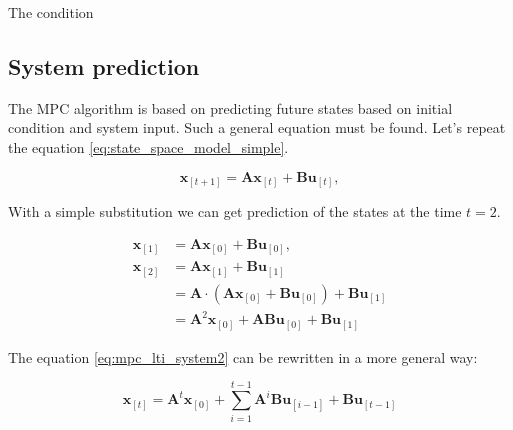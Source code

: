 \documentclass{article}
\begin{document}






The condition 

\subsubsection{}

\subsection{System prediction}
The MPC algorithm is based on predicting future states based on initial condition and system input. Such a general equation must be found. Let's repeat the equation \ref{eq:state_space_model_simple}.

\begin{equation}
\textbf{x}_{[t+1]} = \textbf{A}\textbf{x}_{[t]} + \textbf{B}\textbf{u}_{[t]},
\label{eq:mpc_lti_system}
\end{equation}

With a simple substitution we can get prediction of the states at the time $t = 2$.

\begin{equation}
\begin{split}
\label{eq:mpc_lti_system2}
\textbf{x}_{[1]} &= \textbf{A}\textbf{x}_{[0]} + \textbf{B}\textbf{u}_{[0]},\\
\textbf{x}_{[2]} &= \textbf{A}\textbf{x}_{[1]} + \textbf{B}\textbf{u}_{[1]}\\
&= \textbf{A}\cdot(\textbf{A}\textbf{x}_{[0]} + \textbf{B}\textbf{u}_{[0]}) + \textbf{B}\textbf{u}_{[1]} \\
&=\textbf{A}^2\textbf{x}_{[0]} + \textbf{A}\textbf{B}\textbf{u}_{[0]} + \textbf{B} \textbf{u}_{[1]}
\end{split}
\end{equation}

The equation \ref{eq:mpc_lti_system2} can be rewritten in a more general way:

\begin{equation}
\label{eq:mpc_lti_system_general}
\textbf{x}_{[t]} =\textbf{A}^t\textbf{x}_{[0]} + 
\sum_{i = 1}^{t-1}\textbf{A}^{i}\textbf{B}\textbf{u}_{[i-1]} + \textbf{B} \textbf{u}_{[t-1]}
\end{equation}
\end{document}
